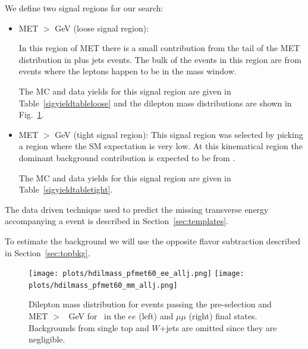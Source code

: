 We define two signal regions for our search:
\begin{itemize}
\item MET $>$ \signalmetl GeV (loose signal region):

In this region of MET there is a small contribution from the tail of the MET distribution 
in \Z plus jets events. 
The bulk of the events in this region are from \ttbar events where the leptons happen to be in the \Z 
mass window.


The MC and data yields for this signal region are given in Table~\ref{sigyieldtableloose} and the dilepton
mass distributions are shown in Fig.~\ref{fig:dilmass60}.



\item MET $>$ \signalmett GeV (tight signal region):
This signal region was selected by picking a region where the SM 
expectation is very low.
At this kinematical region the dominant background contribution is expected to be from \ttbar.

The MC and data yields for this signal region are given in Table~\ref{sigyieldtabletight}.
\end{itemize}

\noindent The data driven technique used to predict the missing transverse energy accompanying 
a \Z event is described in Section~\ref{sec:templates}.

\noindent To estimate the \ttbar background we will use the opposite flavor subtraction
 described in Section~\ref{sec:topbkg}.


\begin{figure}[hbt]
\begin{center}
\texttt{[image: plots/hdilmass\_pfmet60\_ee\_allj.png]}
\texttt{[image: plots/hdilmass\_pfmet60\_mm\_allj.png]}
\caption{\label{fig:dilmass60}\protect Dilepton mass distribution for events passing the pre-selection 
  and MET $>$ \signalmetl~GeV for \lumi\ in the $ee$ (left) and $\mu\mu$ (right) final states. 
Backgrounds from single top and $W$+jets are omitted since they are negligible.}
\end{center}
\end{figure}

